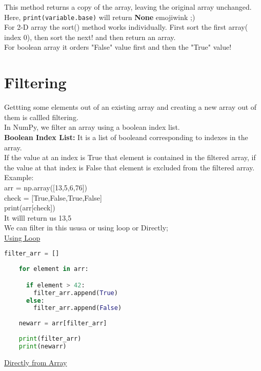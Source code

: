 \documentclass[openany]{book}
\begin{document}
This method returns a copy of the array, leaving the original array unchanged. Here, \texttt{print(variable.base)} will return \textbf{None} emoji{wink} ;) \\

For 2-D array the sort() method works individually. First sort the first array( index 0), then sort the next! and then return an array. \\

For boolean array it orders "False" value first and then the "True" value!


\section{Filtering}
Gettting some elements out of  an existing array and creating a new array out of them is callled filtering. \\
In NumPy, we filter an array using a boolean index list. \\
\textbf{Boolean Index List:} It is a list of booleand corresponding to indexes in the array. \\
If the value at an index is True that element is contained in the filtered array, if the value at that index is False that element is excluded from the filtered array.\\
Example:\\
arr = np.array([13,5,6,76])\\

check = [True,False,True,False]\\
print(arr[check])\\

It willl return us 13,5 \\

We can filter in this ususa or using loop or Directly; \\
\underline{Using Loop}

\begin{lstlisting}[language=Python]
    filter_arr = []
    
    for element in arr:

      if element > 42:
        filter_arr.append(True)
      else:
        filter_arr.append(False)
    
    newarr = arr[filter_arr]
    
    print(filter_arr)
    print(newarr)
    \end{lstlisting}

\underline{Directly from Array}
\end{document}
